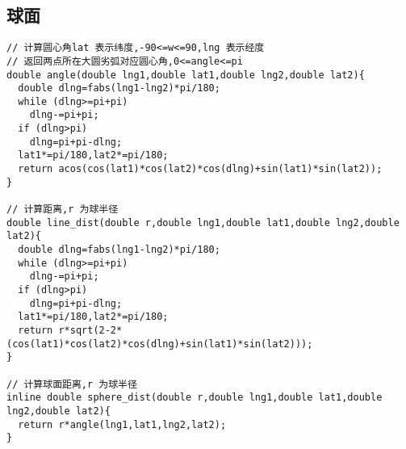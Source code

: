 \subsection{球面}
\begin{lstlisting}[language={}]
// 计算圆心角lat 表示纬度,-90<=w<=90,lng 表示经度
// 返回两点所在大圆劣弧对应圆心角,0<=angle<=pi
double angle(double lng1,double lat1,double lng2,double lat2){
  double dlng=fabs(lng1-lng2)*pi/180;
  while (dlng>=pi+pi)
    dlng-=pi+pi;
  if (dlng>pi)
    dlng=pi+pi-dlng;
  lat1*=pi/180,lat2*=pi/180;
  return acos(cos(lat1)*cos(lat2)*cos(dlng)+sin(lat1)*sin(lat2));
}

// 计算距离,r 为球半径
double line_dist(double r,double lng1,double lat1,double lng2,double lat2){
  double dlng=fabs(lng1-lng2)*pi/180;
  while (dlng>=pi+pi)
    dlng-=pi+pi;
  if (dlng>pi)
    dlng=pi+pi-dlng;
  lat1*=pi/180,lat2*=pi/180;
  return r*sqrt(2-2*(cos(lat1)*cos(lat2)*cos(dlng)+sin(lat1)*sin(lat2)));
}

// 计算球面距离,r 为球半径
inline double sphere_dist(double r,double lng1,double lat1,double lng2,double lat2){
  return r*angle(lng1,lat1,lng2,lat2);
}
\end{lstlisting}
